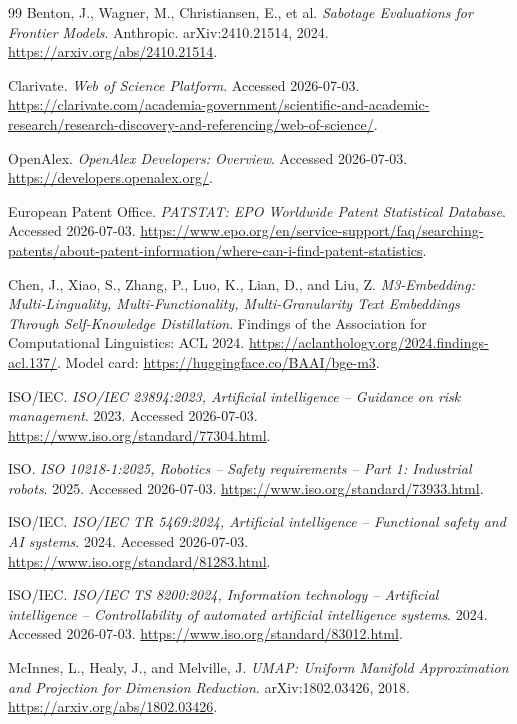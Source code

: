 \documentclass[11pt]{article}
\begin{document}
\begin{thebibliography}{99}
Benton, J., Wagner, M., Christiansen, E., et al. \textit{Sabotage Evaluations for Frontier Models}. Anthropic. arXiv:2410.21514, 2024. \url{https://arxiv.org/abs/2410.21514}.

Clarivate. \textit{Web of Science Platform}. Accessed 2026-07-03. \url{https://clarivate.com/academia-government/scientific-and-academic-research/research-discovery-and-referencing/web-of-science/}.

OpenAlex. \textit{OpenAlex Developers: Overview}. Accessed 2026-07-03. \url{https://developers.openalex.org/}.

European Patent Office. \textit{PATSTAT: EPO Worldwide Patent Statistical Database}. Accessed 2026-07-03. \url{https://www.epo.org/en/service-support/faq/searching-patents/about-patent-information/where-can-i-find-patent-statistics}.

Chen, J., Xiao, S., Zhang, P., Luo, K., Lian, D., and Liu, Z. \textit{M3-Embedding: Multi-Linguality, Multi-Functionality, Multi-Granularity Text Embeddings Through Self-Knowledge Distillation}. Findings of the Association for Computational Linguistics: ACL 2024. \url{https://aclanthology.org/2024.findings-acl.137/}. Model card: \url{https://huggingface.co/BAAI/bge-m3}.

ISO/IEC. \textit{ISO/IEC 23894:2023, Artificial intelligence -- Guidance on risk management}. 2023. Accessed 2026-07-03. \url{https://www.iso.org/standard/77304.html}.

ISO. \textit{ISO 10218-1:2025, Robotics -- Safety requirements -- Part 1: Industrial robots}. 2025. Accessed 2026-07-03. \url{https://www.iso.org/standard/73933.html}.

ISO/IEC. \textit{ISO/IEC TR 5469:2024, Artificial intelligence -- Functional safety and AI systems}. 2024. Accessed 2026-07-03. \url{https://www.iso.org/standard/81283.html}.

ISO/IEC. \textit{ISO/IEC TS 8200:2024, Information technology -- Artificial intelligence -- Controllability of automated artificial intelligence systems}. 2024. Accessed 2026-07-03. \url{https://www.iso.org/standard/83012.html}.

McInnes, L., Healy, J., and Melville, J. \textit{UMAP: Uniform Manifold Approximation and Projection for Dimension Reduction}. arXiv:1802.03426, 2018. \url{https://arxiv.org/abs/1802.03426}.


\end{thebibliography}
\end{document}
